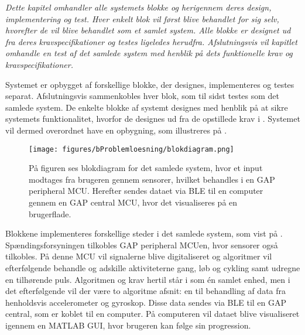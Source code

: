 \textit{Dette kapitel omhandler alle systemets blokke og herigennem deres design, implementering og test. Hver enkelt blok vil først blive behandlet for sig selv, hvorefter de vil blive behandlet som et samlet system. Alle blokke er designet ud fra deres kravspecifikationer og testes ligeledes herudfra. Afslutningsvis vil kapitlet omhandle en test af det samlede system med henblik på dets funktionelle krav og kravspecifikationer.}

Systemet er opbygget af forskellige blokke, der designes, implementeres og testes separat. Afslutningsvis sammenkobles hver blok, som til sidst testes som det samlede system. De enkelte blokke af systemt designes med henblik på at sikre systemets funktionalitet, hvorfor de designes ud fra de opstillede krav i . Systemet vil dermed overordnet have en opbygning, som illustreres på .
\begin{figure}[H]
	\centering
	\texttt{[image: figures/bProblemloesning/blokdiagram.png]}
	\caption{På figuren ses blokdiagram for det samlede system, hvor et input modtages fra brugeren gennem sensorer, hvilket behandles i en GAP peripheral MCU. Herefter sendes dataet via BLE til en computer gennem en GAP central MCU, hvor det visualiseres på en brugerflade.}
	\label{fig:design_blokdiagram}
\end{figure}
Blokkene implementeres forskellige steder i det samlede system, som vist på . Spændingsforsyningen tilkobles GAP peripheral MCUen, hvor sensorer også tilkobles. På denne MCU vil signalerne blive digitaliseret og algoritmer vil efterfølgende behandle og adskille aktiviteterne gang, løb og cykling samt udregne en tilhørende puls. Algoritmen og krav hertil står i  som én samlet enhed, men i det efterfølgende vil der være to algoritme afsnit: en til behandling af data fra henholdsvis accelerometer og gyroskop. Disse data sendes via BLE til en GAP central, som er koblet til en computer. På computeren vil dataet blive visualiseret igennem en MATLAB GUI, hvor brugeren kan følge sin progression.